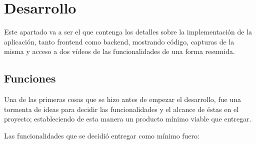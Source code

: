 
\chapter{Desarrollo}
\label{desarrollo}
Este apartado va a ser el que contenga los detalles sobre la implementación de la aplicación, tanto frontend como backend, mostrando código, capturas de la misma y acceso a dos vídeos de las funcionalidades de una forma resumida.
\section{Funciones}
Una de las primeras cosas que se hizo antes de empezar el desarrollo, fue una tormenta de ideas para decidir las funcionalidades y el alcance de éstas en el proyecto; estableciendo de esta manera un producto mínimo viable que entregar.
\vspace{1em}
\par Las funcionalidades que se decidió entregar como mínimo fuero:
